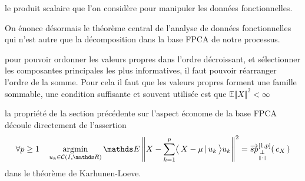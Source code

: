 \noindent le produit scalaire que l'on considère pour manipuler les données fonctionnelles.

\noindent On énonce désormais le théorème central de l'analyse de données fonctionnelles qui n'est autre que la décomposition dans la base FPCA de notre processus.



\begin{rem}
    pour pouvoir ordonner les valeurs propres dans l'ordre décroissant, et sélectionner les composantes principales les plus informatives, il faut pouvoir réarranger l'ordre de la somme. Pour cela il faut que les valeurs propres forment une famille sommable, une condition suffisante et souvent utilisée est que $\mathds E \Vert X \Vert^2 < \infty$
\end{rem}

\begin{rem}
    la propriété de la section précédente sur l'aspect économe de la base FPCA découle directement de l'assertion
    \begin{equation*}
        \forall p \geq 1
        \quad
        \argmin\limits_{u_k \in \mathcal C(I, \mathds R)} \mathds E \left\Vert X - \sum\limits_{k=1}^p \prodscal {X - \mu} {u_k} u_k \right\Vert^2 = \overrightarrow{sp}_{\orthonormal}^{[1,p]}( \, c_X \, )
    \end{equation*}
    dans le théorème de Karhunen-Loeve.
\end{rem}


